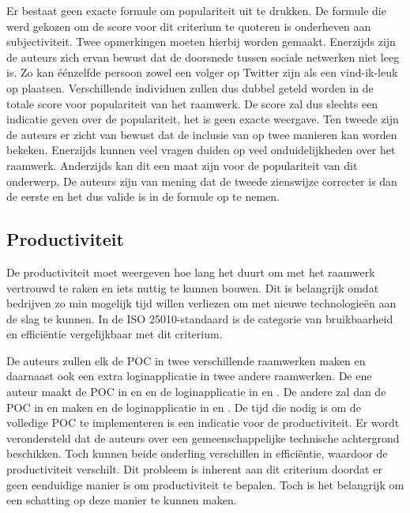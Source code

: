 Er bestaat geen exacte formule om populariteit uit te drukken.
De formule die werd gekozen om de score voor dit criterium te quoteren is onderheven aan subjectiviteit.
Twee opmerkingen moeten hierbij worden gemaakt.
Enerzijds zijn de auteurs zich ervan bewust dat de doorsnede tussen sociale netwerken niet leeg is.
Zo kan éénzelfde persoon zowel een volger op Twitter zijn als een vind-ik-leuk op \fb{} plaatsen.
Verschillende individuen zullen dus dubbel geteld worden in de totale score voor populariteit van het raamwerk.
De score zal dus slechts een indicatie geven over de populariteit,  het is geen exacte weergave.
Ten tweede zijn de auteurs er zicht van bewust dat de inclusie van \so{} op twee manieren kan worden bekeken.
Enerzijds kunnen veel vragen duiden op veel onduidelijkheden over het raamwerk.
Anderzijds kan dit een maat zijn voor de populariteit van dit onderwerp.
De auteurs zijn van mening dat de tweede zienswijze correcter is dan de eerste en het dus valide is \so{} in de formule op te nemen.


\subsection{Productiviteit}
\label{sec:vergelijking-productiviteit}
De productiviteit moet weergeven hoe lang het duurt om met het raamwerk vertrouwd te raken en iets nuttig te kunnen bouwen.
Dit is belangrijk omdat bedrijven zo min mogelijk tijd willen verliezen om met nieuwe technologieën aan de slag te kunnen.
In de ISO 25010-standaard is de categorie van bruikbaarheid en efficiëntie vergelijkbaar met dit criterium.

De auteurs zullen elk de POC in twee verschillende raamwerken maken en daarnaast ook een extra loginapplicatie in twee andere raamwerken.
De ene auteur maakt de POC in \jqm{} en \lungo{} en de loginapplicatie in \st{} en \kendo{}.
De andere zal dan de POC in \st{} en \kendo{} maken en de loginapplicatie in \jqm{} en \lungo{}.
De tijd die nodig is om de volledige POC te implementeren is een indicatie voor de productiviteit. 
Er wordt verondersteld dat de auteurs over een gemeenschappelijke technische achtergrond beschikken.
Toch kunnen beide onderling verschillen in efficiëntie,  waardoor de productiviteit verschilt.
Dit probleem is inherent aan dit criterium doordat er geen eenduidige manier is om productiviteit te bepalen.
Toch is het belangrijk om een schatting op deze manier te kunnen maken.

